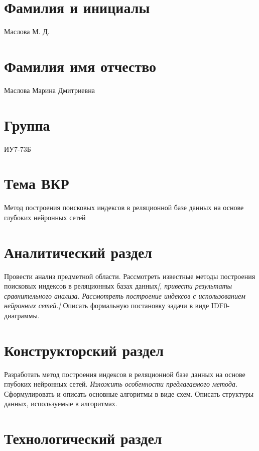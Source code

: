 \documentclass{bmstu}
\begin{document}
\section*{Фамилия и инициалы}

Маслова М. Д.

\section*{Фамилия имя отчество}

Маслова Марина Дмитриевна

\section*{Группа}

ИУ7-73Б

\section*{Тема ВКР}

Метод построения поисковых индексов в реляционной базе данных на основе глубоких
нейронных сетей

\section*{Аналитический раздел}

Провести анализ предметной области. Рассмотреть известные методы построения
поисковых индексов в реляционных базах данных\textit{[, привести результаты
сравнительного анализа}.  \textit{Рассмотреть построение индексов с использованием нейронных
сетей.]} Описать формальную постановку задачи в виде IDF0-диаграммы.

\section*{Конструкторский раздел}

Разработать метод построения индексов в реляционной базе данных на основе
глубоких нейронных сетей. \textit{Изложить особенности предлагаемого метода.}
Сформулировать и описать основные алгоритмы в виде схем. Описать структуры
данных, используемые в алгоритмах.

\section*{Технологический раздел}
\end{document}
